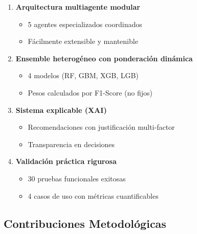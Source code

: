 \documentclass[12pt,a4paper]{article}
\begin{document}
\begin{enumerate}
    \item \textbf{Arquitectura multiagente modular}
    \begin{itemize}
        \item 5 agentes especializados coordinados
        \item Fácilmente extensible y mantenible
    \end{itemize}

    \item \textbf{Ensemble heterogéneo con ponderación dinámica}
    \begin{itemize}
        \item 4 modelos (RF, GBM, XGB, LGB)
        \item Pesos calculados por F1-Score (no fijos)
    \end{itemize}

    \item \textbf{Sistema explicable (XAI)}
    \begin{itemize}
        \item Recomendaciones con justificación multi-factor
        \item Transparencia en decisiones
    \end{itemize}

    \item \textbf{Validación práctica rigurosa}
    \begin{itemize}
        \item 30 pruebas funcionales exitosas
        \item 4 casos de uso con métricas cuantificables
    \end{itemize}
\end{enumerate}

\subsection{Contribuciones Metodológicas}
\end{document}
